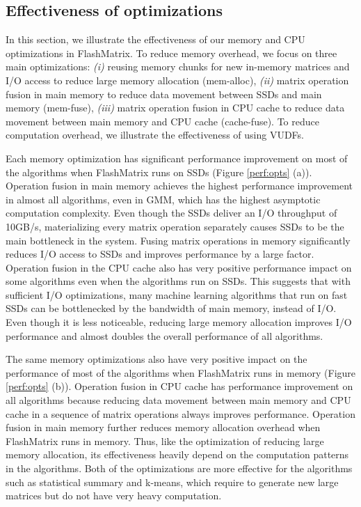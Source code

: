 \subsection{Effectiveness of optimizations}

In this section, we illustrate the effectiveness of our memory and CPU
optimizations in FlashMatrix. To reduce memory overhead, we focus on three
main optimizations: \textit{(i)} reusing memory chunks for new in-memory
matrices and I/O access to reduce large memory allocation (mem-alloc),
\textit{(ii)} matrix operation fusion in main memory to reduce data movement
between SSDs and main memory (mem-fuse), \textit{(iii)} matrix operation
fusion in CPU cache to reduce data movement between main memory and CPU cache
(cache-fuse). To reduce computation overhead, we illustrate the effectiveness
of using VUDFs.

Each memory optimization has significant performance improvement on most of
the algorithms when FlashMatrix runs on SSDs (Figure \ref{perf:opts} (a)).
Operation fusion in main memory achieves
the highest performance improvement in almost all algorithms, even in GMM,
which has the highest asymptotic computation complexity. Even though the SSDs
deliver an I/O throughput of 10GB/s, materializing every matrix operation
separately causes SSDs to be the main bottleneck in the system.
Fusing matrix operations in memory significantly reduces I/O access to SSDs and
improves performance by a large factor. Operation fusion in the CPU cache also
has very positive performance impact on some algorithms even when
the algorithms run on SSDs. This suggests that with sufficient I/O optimizations,
many machine learning algorithms that run on fast SSDs can be bottlenecked by
the bandwidth of main memory, instead of I/O. Even though it is less noticeable,
reducing large memory allocation improves I/O performance and almost doubles
the overall performance of all algorithms.

The same memory optimizations also have very positive impact on the performance
of most of the algorithms when FlashMatrix runs in memory (Figure
\ref{perf:opts} (b)). Operation fusion in CPU cache has performance improvement
on all algorithms because reducing data movement between main memory and CPU
cache in a sequence of matrix operations always improves performance.
Operation fusion in main memory further reduces memory allocation overhead when
FlashMatrix runs in memory. Thus, like the optimization of reducing large
memory allocation, its effectiveness heavily depend on the computation patterns
in the algorithms. Both of the optimizations are more effective for
the algorithms such as statistical summary and k-means, which require to
generate new large matrices but do not have very heavy computation.

